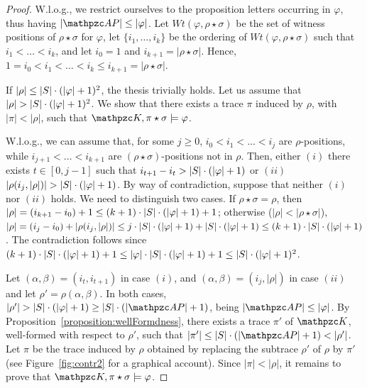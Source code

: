 \begin{proof}
W.l.o.g., we restrict ourselves to the proposition letters occurring in  $\varphi$, thus having $|\Prop|\leq |\varphi|$.
Let $Wt(\varphi,\rho\star\sigma)$ be the set of witness positions of $\rho\star\sigma$ for $\varphi$, let $\{i_1,\ldots,i_k\}$ be the ordering of $Wt(\varphi,\rho\star\sigma)$ such that $i_1<\ldots <i_k$, and let $i_0=1$ and $i_{k+1}=|\rho\star\sigma|$. Hence, $1=i_0< i_1<\ldots <i_k \leq i_{k+1}=|\rho\star\sigma|$.

If $|\rho| \leq |S|\cdot (|\varphi|+1)^2$, the thesis trivially holds.
Let us assume that $|\rho|> |\States|\cdot (|\varphi|+1)^2$. We show that there exists a trace $\pi$ induced by $\rho$, with $|\pi| < |\rho |$, such that $\Ku,\pi\star\sigma\models \varphi$.

W.l.o.g., we can assume that, for some $j\geq 0$, $i_0<i_1<\ldots <i_j$ are $\rho$-positions, while $i_{j+1}<\ldots <i_{k+1}$ are $(\rho\star\sigma)$-positions not in $\rho$. 
Then, either $(i)$ there exists $t\in [0,j-1]$ such that $i_{t+1}-i_t>|S|\cdot(|\varphi|+1)$ or $(ii)$ $|\rho(i_j,|\rho|)|>|\States|\cdot(|\varphi|+1)$. By way of contradiction, suppose that neither $(i)$ nor $(ii)$ holds. We need to distinguish two cases. If $\rho\star\sigma=\rho$, then
$|\rho| = (i_{k+1}-i_0)+1\leq (k+1) \cdot |S|\cdot (|\varphi|+1)+1$; otherwise ($|\rho| < |\rho\star\sigma|$), $|\rho| = (i_j - i_0) + |\rho(i_j,|\rho|)| \leq j \cdot |S|\cdot (|\varphi|+1) + |S|\cdot (|\varphi|+1) \leq (k+1) \cdot |S|\cdot (|\varphi|+1)$. The contradiction follows since $(k+1) \cdot |S|\cdot (|\varphi|+1)+1 \leq |\varphi| \cdot |S|\cdot (|\varphi|+1)+1 \leq |S|\cdot (|\varphi|+1)^2$.

Let 
$(\alpha,\beta)=(i_t,i_{t+1})$ in case $(i)$, and $(\alpha,\beta)=(i_j,|\rho|)$ in case $(ii)$ and let $\rho'=\rho(\alpha,\beta)$. In both cases, 
$|\rho'|> |\States|\cdot (|\varphi|+1)\geq |\States|\cdot (|\Prop|+1)$, being $|\Prop|\leq |\varphi|$.
%
By Proposition~\ref{proposition:wellFormdness}, there exists a trace $\pi'$ of $\Ku$, well-formed with respect to $\rho'$, such that $|\pi'|\leq |\States|\cdot(|\Prop|+1) < |\rho'|$. Let $\pi$ be the trace induced by $\rho$ obtained by replacing the subtrace $\rho'$ of $\rho$ by $\pi'$ (see Figure~\ref{fig:contr2} for a graphical account).
Since $|\pi|<|\rho|$, it remains to prove that  $\Ku,\pi\star\sigma\models \varphi$.


\end{proof}
